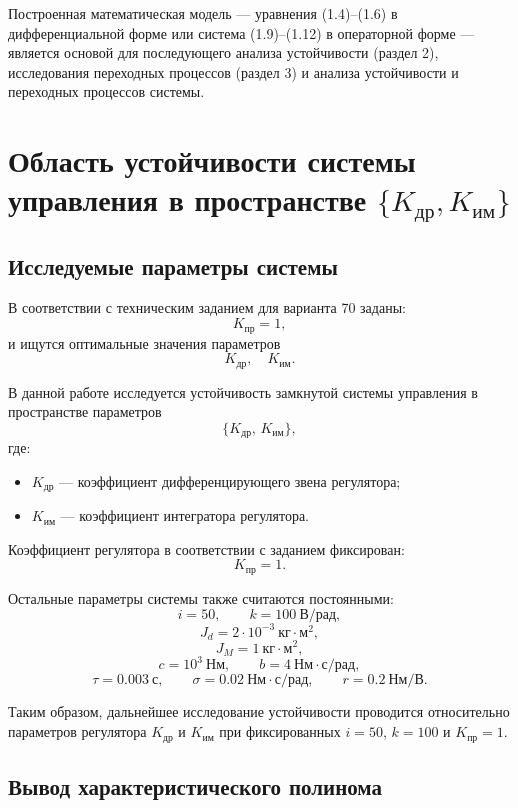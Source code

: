 \documentclass[a4paper, 14pt]{extarticle}
\begin{document}
Построенная математическая модель — уравнения (1.4)–(1.6) в дифференциальной форме или система (1.9)–(1.12) в операторной форме — является основой для последующего анализа устойчивости (раздел 2), исследования переходных процессов (раздел 3) и анализа устойчивости и переходных процессов системы.
\newpage
\section{Область устойчивости системы управления в пространстве $\{K_{\text{др}}, K_{\text{им}}\}$}

\subsection{Исследуемые параметры системы}

В соответствии с техническим заданием для варианта 70 заданы:
\[
    K_{\text{пр}}=1,
\]
и ищутся оптимальные значения параметров
\[
    K_{\text{др}}, \quad K_{\text{им}}.
\]

В данной работе исследуется устойчивость замкнутой системы управления в пространстве параметров
\[
    \{K_{\text{др}},\,K_{\text{им}}\},
\]
где:
\begin{itemize}
    \item \(K_{\text{др}}\) — коэффициент дифференцирующего звена регулятора;
    \item \(K_{\text{им}}\) — коэффициент интегратора регулятора.
\end{itemize}

Коэффициент регулятора в соответствии с заданием фиксирован:
\[
    K_{\text{пр}}=1.
\]

Остальные параметры системы также считаются постоянными:
\[
    i = 50,\qquad k = 100\ \text{В/рад},
\]
\[
    J_d=2\cdot10^{-3}\ \text{кг}\cdot\text{м}^2,
\]
\[
    J_M=1\ \text{кг}\cdot\text{м}^2,
\]
\[
    c=10^3\ \text{Нм},
    \qquad
    b=4\ \text{Нм}\cdot\text{с/рад},
\]
\[
    \tau=0.003\ \text{с},
    \qquad
    \sigma=0.02\ \text{Нм}\cdot\text{с/рад},
    \qquad
    r=0.2\ \text{Нм/В}.
\]

Таким образом, дальнейшее исследование устойчивости проводится относительно параметров регулятора \(K_{\text{др}}\) и \(K_{\text{им}}\) при фиксированных \(i=50\), \(k=100\) и \(K_{\text{пр}}=1\).

\subsection{Вывод характеристического полинома}
\end{document}

